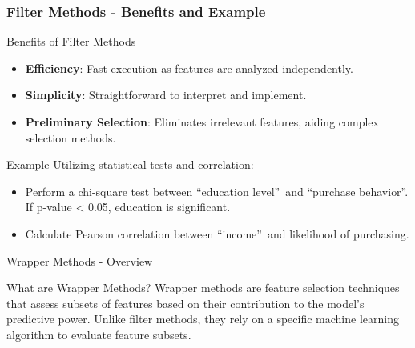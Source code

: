 \documentclass[aspectratio=169]{beamer}
\begin{document}
\begin{frame}[fragile]
    \frametitle{Filter Methods - Benefits and Example}
    \begin{block}{Benefits of Filter Methods}
        \begin{itemize}
            \item \textbf{Efficiency}: Fast execution as features are analyzed independently.
            \item \textbf{Simplicity}: Straightforward to interpret and implement.
            \item \textbf{Preliminary Selection}: Eliminates irrelevant features, aiding complex selection methods.
        \end{itemize}
    \end{block}

    \begin{block}{Example}
        Utilizing statistical tests and correlation:
        \begin{itemize}
            \item Perform a chi-square test between \textquotedblleft education level\textquotedblright\ and \textquotedblleft purchase behavior\textquotedblright. If p-value < 0.05, education is significant.
            \item Calculate Pearson correlation between \textquotedblleft income\textquotedblright\ and likelihood of purchasing.
        \end{itemize}
    \end{block}
\end{frame}

\begin{frame}[fragile]{Wrapper Methods - Overview}
    \begin{block}{What are Wrapper Methods?}
        Wrapper methods are feature selection techniques that assess subsets of features based on their contribution to the model's predictive power. Unlike filter methods, they rely on a specific machine learning algorithm to evaluate feature subsets.
    \end{block}
\end{frame}
\end{document}
